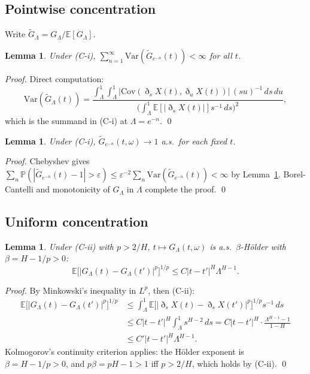 \documentclass[11pt,a4paper]{article}
\newtheorem{lemma}[theorem]{Lemma}
\theoremstyle{definition}
\theoremstyle{remark}
\newcommand{\E}{\mathbb{E}}
\newcommand{\GL}{G_\Lambda}
\newcommand{\Gtil}{\tilde{G}_\Lambda}
\begin{document}
\subsection{Pointwise concentration}

Write $\Gtil=\GL/\E[\GL]$.

\begin{lemma}\label{lem:varsum}
Under (C-i), $\sum_{n=1}^\infty\mathrm{Var}(\tilde G_{e^{-n}}(t))<\infty$
for all $t$.
\end{lemma}

\begin{proof}
Direct computation:
\[
  \mathrm{Var}(\Gtil(t))
  = \frac{\int_\Lambda^1\!\int_\Lambda^1
    |\mathrm{Cov}(\eth_s X(t),\eth_u X(t))|\,(su)^{-1}\,ds\,du}
  {\bigl(\int_\Lambda^1\E[|\eth_s X(t)|]s^{-1}\,ds\bigr)^2},
\]
which is the summand in (C-i) at $\Lambda=e^{-n}$. \qed
\end{proof}

\begin{lemma}\label{lem:ptwise}
Under (C-i), $\tilde G_{e^{-n}}(t,\omega)\to1$ a.s.\ for each fixed $t$.
\end{lemma}

\begin{proof}
Chebyshev gives
$\sum_n\mathbb{P}(|\tilde G_{e^{-n}}(t)-1|>\varepsilon)
\le\varepsilon^{-2}\sum_n\mathrm{Var}(\tilde G_{e^{-n}}(t))<\infty$
by Lemma~\ref{lem:varsum}. Borel-Cantelli and monotonicity of $\GL$
in $\Lambda$ complete the proof. \qed
\end{proof}

\subsection{Uniform concentration}

\begin{lemma}\label{lem:holder}
Under (C-ii) with $p>2/H$, $t\mapsto\GL(t,\omega)$ is a.s.\
$\beta$-H\"{o}lder with $\beta=H-1/p>0$:
\[
  \E\bigl[|\GL(t)-\GL(t')|^p\bigr]^{1/p}
  \le C|t-t'|^H\Lambda^{H-1}.
\]
\end{lemma}

\begin{proof}
By Minkowski's inequality in $L^p$, then (C-ii):
\begin{align*}
  \E\bigl[|\GL(t)-\GL(t')|^p\bigr]^{1/p}
  &\le\int_\Lambda^1\E\bigl[|\eth_s X(t)-\eth_s X(t')|^p\bigr]^{1/p}
    s^{-1}\,ds\\
  &\le C|t-t'|^H\int_\Lambda^1 s^{H-2}\,ds
   = C|t-t'|^H\cdot\frac{\Lambda^{H-1}-1}{1-H}\\
  &\le C'|t-t'|^H\Lambda^{H-1}.
\end{align*}
Kolmogorov's continuity criterion applies: the H\"{o}lder exponent
is $\beta=H-1/p>0$, and $p\beta=pH-1>1$ iff $p>2/H$, which holds by
(C-ii). \qed
\end{proof}
\end{document}
